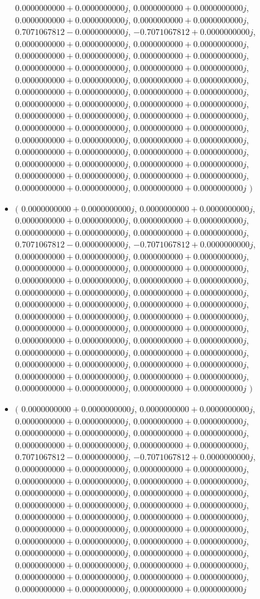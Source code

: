 \documentclass[14pt,a4paper]{article}
\begin{document}
\begin{itemize}
$0.0000000000+0.0000000000j$, $0.0000000000+0.0000000000j$, $0.0000000000+0.0000000000j$, $0.0000000000+0.0000000000j$, $0.7071067812-0.0000000000j$, $-0.7071067812+0.0000000000j$, $0.0000000000+0.0000000000j$, $0.0000000000+0.0000000000j$, $0.0000000000+0.0000000000j$, $0.0000000000+0.0000000000j$, $0.0000000000+0.0000000000j$, $0.0000000000+0.0000000000j$, $0.0000000000+0.0000000000j$, $0.0000000000+0.0000000000j$, $0.0000000000+0.0000000000j$, $0.0000000000+0.0000000000j$, $0.0000000000+0.0000000000j$, $0.0000000000+0.0000000000j$, $0.0000000000+0.0000000000j$, $0.0000000000+0.0000000000j$, $0.0000000000+0.0000000000j$, $0.0000000000+0.0000000000j$, $0.0000000000+0.0000000000j$, $0.0000000000+0.0000000000j$, $0.0000000000+0.0000000000j$, $0.0000000000+0.0000000000j$, $0.0000000000+0.0000000000j$, $0.0000000000+0.0000000000j$, $0.0000000000+0.0000000000j$, $0.0000000000+0.0000000000j$, $0.0000000000+0.0000000000j$, $0.0000000000+0.0000000000j$
$\big)$
\item
$\big($
$0.0000000000+0.0000000000j$, $0.0000000000+0.0000000000j$, $0.0000000000+0.0000000000j$, $0.0000000000+0.0000000000j$, $0.0000000000+0.0000000000j$, $0.0000000000+0.0000000000j$, $0.7071067812-0.0000000000j$, $-0.7071067812+0.0000000000j$, $0.0000000000+0.0000000000j$, $0.0000000000+0.0000000000j$, $0.0000000000+0.0000000000j$, $0.0000000000+0.0000000000j$, $0.0000000000+0.0000000000j$, $0.0000000000+0.0000000000j$, $0.0000000000+0.0000000000j$, $0.0000000000+0.0000000000j$, $0.0000000000+0.0000000000j$, $0.0000000000+0.0000000000j$, $0.0000000000+0.0000000000j$, $0.0000000000+0.0000000000j$, $0.0000000000+0.0000000000j$, $0.0000000000+0.0000000000j$, $0.0000000000+0.0000000000j$, $0.0000000000+0.0000000000j$, $0.0000000000+0.0000000000j$, $0.0000000000+0.0000000000j$, $0.0000000000+0.0000000000j$, $0.0000000000+0.0000000000j$, $0.0000000000+0.0000000000j$, $0.0000000000+0.0000000000j$, $0.0000000000+0.0000000000j$, $0.0000000000+0.0000000000j$
$\big)$
\item
$\big($
$0.0000000000+0.0000000000j$, $0.0000000000+0.0000000000j$, $0.0000000000+0.0000000000j$, $0.0000000000+0.0000000000j$, $0.0000000000+0.0000000000j$, $0.0000000000+0.0000000000j$, $0.0000000000+0.0000000000j$, $0.0000000000+0.0000000000j$, $0.7071067812-0.0000000000j$, $-0.7071067812+0.0000000000j$, $0.0000000000+0.0000000000j$, $0.0000000000+0.0000000000j$, $0.0000000000+0.0000000000j$, $0.0000000000+0.0000000000j$, $0.0000000000+0.0000000000j$, $0.0000000000+0.0000000000j$, $0.0000000000+0.0000000000j$, $0.0000000000+0.0000000000j$, $0.0000000000+0.0000000000j$, $0.0000000000+0.0000000000j$, $0.0000000000+0.0000000000j$, $0.0000000000+0.0000000000j$, $0.0000000000+0.0000000000j$, $0.0000000000+0.0000000000j$, $0.0000000000+0.0000000000j$, $0.0000000000+0.0000000000j$, $0.0000000000+0.0000000000j$, $0.0000000000+0.0000000000j$, $0.0000000000+0.0000000000j$, $0.0000000000+0.0000000000j$, $0.0000000000+0.0000000000j$, $0.0000000000+0.0000000000j$

\end{itemize}
\end{document}

